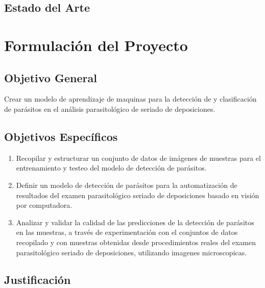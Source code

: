 \documentclass[letter,12pt]{report}
\begin{document}
\section{Estado del Arte}\label{arte}

\chapter{Formulación del Proyecto}\label{formulación}

\section{Objetivo General}
Crear un modelo de aprendizaje de maquinas para la detección de y clasificación de
parásitos en el análisis parasitológico de seriado de deposiciones.

\section{Objetivos Específicos}
\begin{enumerate}\justifying
    \item Recopilar y estructurar un conjunto de datos de imágenes de muestras para el entrenamiento y testeo del modelo de detección de parásitos.
  \item Definir un modelo de detección de parásitos para la automatización de resultados del examen parasitológico seriado de deposiciones basado en visión por computadora.
  \item Analizar y validar la calidad de las predicciones de la detección de parásitos en las muestras, a través de experimentación con el conjuntos de datos recopilado y con muestras obtenidas desde procedimientos reales del examen parasitológico seriado de deposiciones, utilizando imagenes microscopicas.
\end{enumerate}

\section{Justificación}
%
\blindtext
\end{document}
